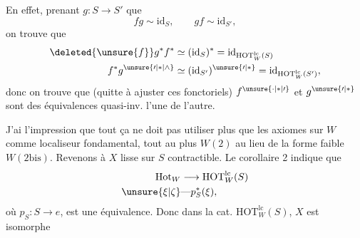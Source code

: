 En effet, prenant $g\colon S\longrightarrow S'$  que
\[ fg\sim\mathrm{id}_S,\qquad gf\sim\mathrm{id}_{S'}, \]
on trouve que
\[ \begin{aligned}\deleted{\unsure{f}}g^*f^*&\simeq(\mathrm{id}_S)^*=\mathrm{id}_{\mathrm{HOT}^{\mathrm{lc}}_W(S)}\\
f^*g^{\unsure{\prime|*|\wedge}}&\simeq(\mathrm{id}_{S'})^{\unsure{\prime|*}}=\mathrm{id}_{\mathrm{HOT}^{\mathrm{lc}}_W(S')},\end{aligned} \]
donc on trouve que (quitte à ajuster ces  fonctoriels) $f^{\unsure{\cdot|*|\prime}}$ et $g^{\unsure{\prime|*}}$ sont des équivalences quasi-inv. l'une de l'autre.

J'ai l'impression que tout ça ne doit pas utiliser plus que les axiomes  sur $W$ comme localiseur fondamental, tout au plus $W(2)$ au lieu de la forme faible $W(2\mathrm{bis})$.
Revenons à $X$ lisse sur $S$ contractible. Le corollaire 2 indique que
\[ \begin{aligned}\mathrm{Hot}_W&\longrightarrow\mathrm{HOT}^{\mathrm{lc}}_W(S)\\
\unsure{\xi|\zeta}&\text{---}p_S^*(\xi),\end{aligned} \]
où $p_S\colon S\longrightarrow e$, est une équivalence. Donc dans la cat. $\mathrm{HOT}^{\mathrm{lc}}_W(S)$, $X$ est isomorphe

